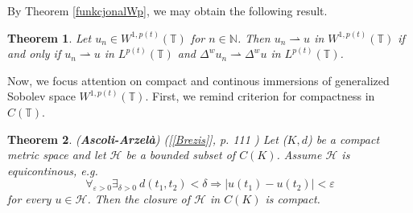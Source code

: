 \documentclass[12pt,a4paper,oneside,titlepage]{article}
\newtheorem{Twierdzenie}{Theorem}
\renewcommand{\epsilon}{\varepsilon}
\begin{document}
By Theorem \ref{funkcjonalWp}, we may obtain the following result.
\begin{Twierdzenie} Let $u_n \in W^{1,p(t)}(\mathbb{T})$ for $n \in \mathbb{N}$. Then $u_n \rightharpoonup u$ in $W^{1,p(t)}(\mathbb{T})$ if and only if $u_n \rightharpoonup u$ in $L^{p(t)}(\mathbb{T})$ and $\Delta^{w} u_n \rightharpoonup \Delta^{w} u$ in $L^{p(t)}(\mathbb{T})$.
\end{Twierdzenie}
\bigskip
Now, we focus attention on compact and continous immersions of generalized Sobolev space $W^{1,p(t)}(\mathbb{T})$. First, we remind criterion for compactness in $C(\mathbb{T})$.
\begin{Twierdzenie}(\textbf{Ascoli-Arzelà}) ([\ref{Brezis}], p. 111 ) Let ($K,d$) be a compact metric space and let $\mathcal{H}$ be a bounded subset of $C(K)$. Assume $\mathcal{H}$ is equicontinous, e.g.
\begin{equation}
\nonumber
\forall_{\epsilon>0}  \exists_{\delta>0} ~ d(t_1, t_2) < \delta \Rightarrow\vert u(t_1) - u(t_2) \vert < \epsilon 
\end{equation}
for every $u \in \mathcal{H}$. Then the closure of $\mathcal{H}$ in $C(K)$ is compact.
\end{Twierdzenie}
\end{document}
